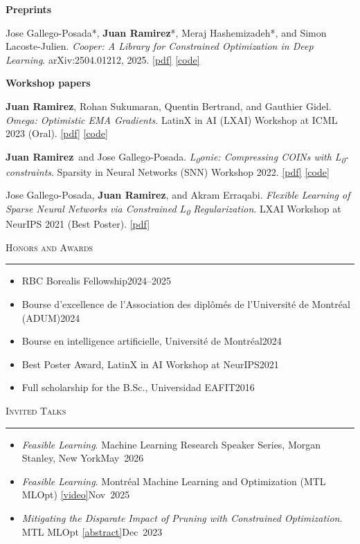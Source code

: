 \documentclass[11pt,letterpaper]{article}
\newcommand{\me}{\textbf{Juan Ramirez}}
\newcommand{\eqc}{*}                        %
\newcommand{\ditem}[2]{\item #1\unskip\nobreak\hfill\mbox{#2}}
\newcommand{\cvsection}[1]{%
  \par\addvspace{1.1em}%
  \Needspace{4\baselineskip}%
  {\noindent\large\scshape #1\par}%
  \nobreak\vspace{-0.55em}%
  {\noindent\color{rulegray}\rule{\textwidth}{0.4pt}\par}%
  \nobreak\addvspace{0.45em}%
}
\begin{document}
\textbf{Preprints}
\begin{enumerate}[label={[P\arabic*]}]
  \item Jose Gallego-Posada\eqc, \me\eqc, Meraj Hashemizadeh\eqc, and Simon Lacoste-Julien. \emph{Cooper: A Library for Constrained Optimization in Deep Learning}. arXiv:2504.01212, 2025. \href{https://arxiv.org/abs/2504.01212}{[pdf]} \href{https://github.com/cooper-org/cooper}{[code]}
\end{enumerate}

\textbf{Workshop papers}
\begin{enumerate}[label={[W\arabic*]}]
  \item \me, Rohan Sukumaran, Quentin Bertrand, and Gauthier Gidel. \emph{Omega: Optimistic EMA Gradients}. LatinX in AI (LXAI) Workshop at ICML 2023 (Oral). \href{https://arxiv.org/abs/2306.07905}{[pdf]} \href{https://github.com/juan43ramirez/omega}{[code]}
  \item \me\ and Jose Gallego-Posada. \emph{L\textsubscript{0}onie: Compressing COINs with L\textsubscript{0}-constraints}. Sparsity in Neural Networks (SNN) Workshop 2022. \href{https://arxiv.org/abs/2207.04144}{[pdf]} \href{https://github.com/juan43ramirez/l0onie}{[code]}
  \item Jose Gallego-Posada, \me, and Akram Erraqabi. \emph{Flexible Learning of Sparse Neural Networks via Constrained L\textsubscript{0} Regularization}. LXAI Workshop at NeurIPS 2021 (Best Poster). \href{https://openreview.net/forum?id=SUQsWPcK39P}{[pdf]}
\end{enumerate}

\cvsection{Honors and Awards}

\begin{itemize}
  \ditem{RBC Borealis Fellowship}{2024–2025}
  \ditem{Bourse d'excellence de l'Association des diplômés de l'Université de Montréal (ADUM)}{2024}
  \ditem{Bourse en intelligence artificielle, Université de Montréal}{2024}
  \ditem{Best Poster Award, LatinX in AI Workshop at NeurIPS}{2021}
  \ditem{Full scholarship for the B.Sc., Universidad EAFIT}{2016}
\end{itemize}

\cvsection{Invited Talks}

\begin{itemize}
  \ditem{\emph{Feasible Learning}. Machine Learning Research Speaker Series, Morgan Stanley, New York}{May 2026}
  \ditem{\emph{Feasible Learning}. Montréal Machine Learning and Optimization (MTL MLOpt) \href{https://youtu.be/htKvFNokwQc}{[video]}}{Nov 2025}
  \ditem{\emph{Mitigating the Disparate Impact of Pruning with Constrained Optimization}. MTL MLOpt \href{https://mtl-mlopt.github.io/talks_entries/2023/2023_12_07_Juan_Ramirez.html}{\mbox{[abstract]}}}{Dec 2023}
\end{itemize}
\end{document}
